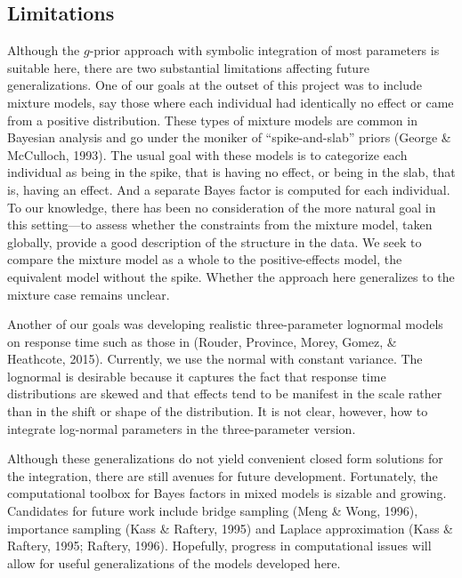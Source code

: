 \documentclass[american,man]{apa6}
\begin{document}
\subsection{Limitations}\label{limitations}

Although the \(g\)-prior approach with symbolic integration of most
parameters is suitable here, there are two substantial limitations
affecting future generalizations. One of our goals at the outset of this
project was to include mixture models, say those where each individual
had identically no effect or came from a positive distribution. These
types of mixture models are common in Bayesian analysis and go under the
moniker of \enquote{spike-and-slab} priors (George \& McCulloch, 1993).
The usual goal with these models is to categorize each individual as
being in the spike, that is having no effect, or being in the slab, that
is, having an effect. And a separate Bayes factor is computed for each
individual. To our knowledge, there has been no consideration of the
more natural goal in this setting---to assess whether the constraints
from the mixture model, taken globally, provide a good description of
the structure in the data. We seek to compare the mixture model as a
whole to the positive-effects model, the equivalent model without the
spike. Whether the approach here generalizes to the mixture case remains
unclear.

Another of our goals was developing realistic three-parameter lognormal
models on response time such as those in (Rouder, Province, Morey,
Gomez, \& Heathcote, 2015). Currently, we use the normal with constant
variance. The lognormal is desirable because it captures the fact that
response time distributions are skewed and that effects tend to be
manifest in the scale rather than in the shift or shape of the
distribution. It is not clear, however, how to integrate log-normal
parameters in the three-parameter version.

Although these generalizations do not yield convenient closed form
solutions for the integration, there are still avenues for future
development. Fortunately, the computational toolbox for Bayes factors in
mixed models is sizable and growing. Candidates for future work include
bridge sampling (Meng \& Wong, 1996), importance sampling (Kass \&
Raftery, 1995) and Laplace approximation (Kass \& Raftery, 1995;
Raftery, 1996). Hopefully, progress in computational issues will allow
for useful generalizations of the models developed here.

\clearpage
\end{document}

